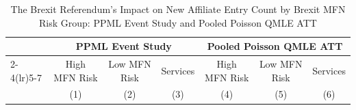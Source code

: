 \begin{table}[!htbp]\centering\caption{\label{tab:EntrySector}The Brexit Referendum's Impact on New Affiliate Entry Count by Brexit MFN Risk Group: PPML Event Study and Pooled Poisson QMLE ATT}\begin{threeparttable}\begin{tabular}{l*{6}{c}}\toprule
\multicolumn{1}{c}{} & \multicolumn{3}{c}{PPML Event Study} & \multicolumn{3}{c}{Pooled Poisson QMLE ATT} \\
\cmidrule(lr){2-4}\cmidrule(lr){5-7}
\multicolumn{1}{c}{} & \multicolumn{1}{c}{High MFN Risk} & \multicolumn{1}{c}{Low MFN Risk} & \multicolumn{1}{c}{Services} & \multicolumn{1}{c}{High MFN Risk} & \multicolumn{1}{c}{Low MFN Risk} & \multicolumn{1}{c}{Services} \\
\multicolumn{1}{c}{} & \multicolumn{1}{c}{(1)} & \multicolumn{1}{c}{(2)} & \multicolumn{1}{c}{(3)} & \multicolumn{1}{c}{(4)} & \multicolumn{1}{c}{(5)} & \multicolumn{1}{c}{(6)} \\


\end{tabular}
\end{threeparttable}
\end{table}
